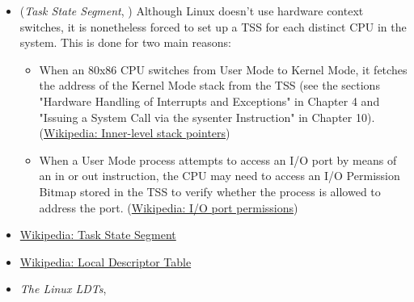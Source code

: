 \begin{itemize}
\item (\emph{Task State Segment}, \cite[Sec 3.3.2]{bovet2005understanding}) Although Linux
  doesn't use hardware context switches, it is nonetheless forced to set up a TSS for each
  distinct CPU in the system. This is done for two main reasons:
  \begin{itemize}
  \item When an 80x86 CPU switches from User Mode to Kernel Mode, it fetches the address
    of the Kernel Mode stack from the TSS (see the sections "Hardware Handling of
    Interrupts and Exceptions" in Chapter 4 and "Issuing a System Call via the sysenter
    Instruction" in Chapter
    10). (\href{https://en.wikipedia.org/wiki/Task_State_Segment#Inner-level_stack_pointers}{Wikipedia:
      Inner-level stack pointers})
  \item When a User Mode process attempts to access an I/O port by means of an in or out
    instruction, the CPU may need to access an I/O Permission Bitmap stored in the TSS to
    verify whether the process is allowed to address the
    port. (\href{https://en.wikipedia.org/wiki/Task_State_Segment#I.2FO_port_permissions}{Wikipedia:
      I/O port permissions})
  \end{itemize}
\item \href{https://en.wikipedia.org/wiki/Task_State_Segment}{Wikipedia: Task State
    Segment}
\item \href{https://en.wikipedia.org/wiki/Local_Descriptor_Table}{Wikipedia: Local
    Descriptor Table}
\item \emph{The Linux LDTs}, \cite[Sec 2.3.2]{bovet2005understanding}
\end{itemize}

